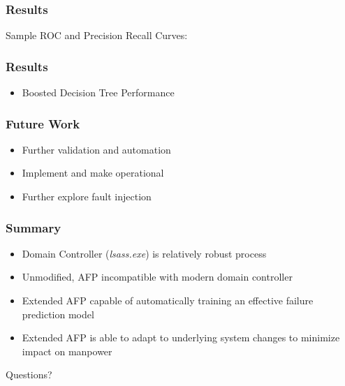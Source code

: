 \documentclass[aspectratio=169]{beamer}
\begin{document}
\begin{frame}
  \frametitle{Results}
  Sample ROC and Precision Recall Curves:
  \begin{multicols}{2}
  \end{multicols}
\end{frame}


\begin{frame}
  \frametitle{Results}
  \begin{itemize}
  \item{Boosted Decision Tree Performance}
  \end{itemize}
  \figMemLeakPostUpdateBoostingPerf
\end{frame}


\begin{frame}
  \frametitle{Future Work}
  \begin{itemize}
  \item{Further validation and automation}
  \item{Implement and make operational}
  \item{Further explore fault injection}
  \end{itemize}
\end{frame}


\begin{frame}
  \frametitle{Summary}
  \begin{itemize}
  \item{Domain Controller (\emph{lsass.exe}) is relatively robust process}
  \item{Unmodified, AFP incompatible with modern domain controller}
  \item{Extended AFP capable of automatically training an effective failure
  prediction model}
  \item{Extended AFP is able to adapt to underlying system changes to minimize
  impact on manpower}
  \end{itemize}
\end{frame}


\begin{frame}
  \centering
  \Huge Questions?
\end{frame}


\frame[allowframebreaks]{
  
  
} 
 
\end{document}
